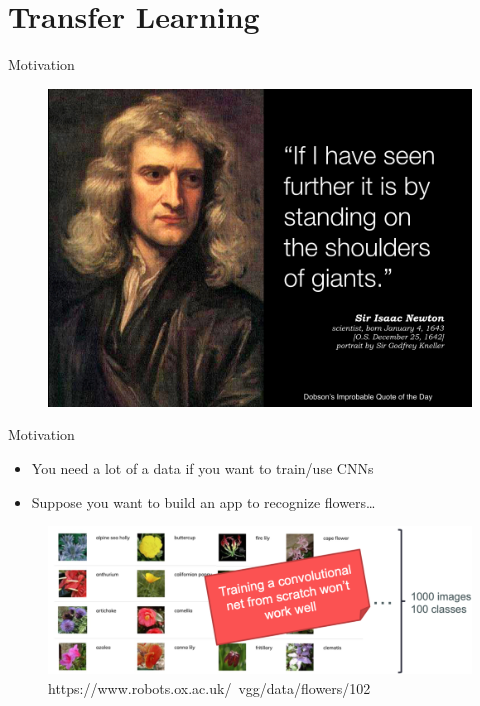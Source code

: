 \documentclass[serif, aspectratio=169]{beamer}
\begin{document}
\section{Transfer Learning}

\begin{frame}{Motivation}
	\begin{figure}[htpb]
		\begin{center}
			\includegraphics[keepaspectratio, scale=0.25]{pic/giant}
		\end{center}
	\end{figure}
\end{frame}

\begin{frame}{Motivation}
	\begin{itemize}
		\item You need a lot of a data if you want to train/use CNNs
		\item Suppose you want to build an app to recognize flowers…
	\end{itemize}
	\begin{figure}[htpb]
		\begin{center}
			\includegraphics[keepaspectratio, scale=0.25]{pic/TL_motiv}
			\caption*{https://www.robots.ox.ac.uk/~vgg/data/flowers/102}
		\end{center}
	\end{figure}
\end{frame}
\end{document}
